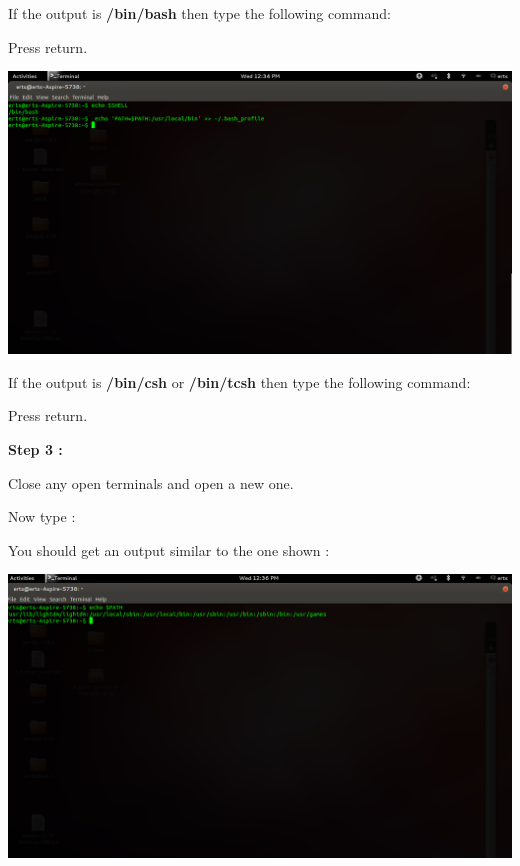 \begin{flushleft}
If the output is \textbf{/bin/bash} then type the following command:
\medskip

\medskip

Press return.

\includegraphics[scale=0.3]{f2}

\medskip

If the output is \textbf{/bin/csh} or \textbf{/bin/tcsh} then type the following command:

\medskip

\medskip

Press return. 


\medskip

\textbf{Step 3 :}

\medskip

Close any open terminals and open a new one.

Now type :

\medskip


\medskip

You should get an output similar to the one shown :
\medskip

\includegraphics[scale=0.3]{f3}


\end{flushleft}
